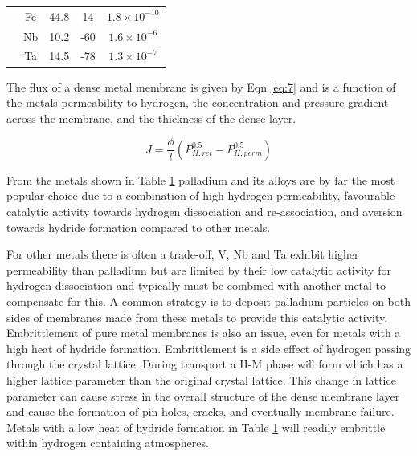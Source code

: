 \begin{table}[htbp]
{\begin{tabular}{@{}ccccc@{}}
                         & Fe                         & 44.8                                                                                             & 14                                                                               & $1.8\times 10^{-10}$                                                                                      \\
                         & Nb                         & 10.2                                                                                             & -60                                                                              & $1.6\times 10^{-6}$                                                                                       \\
                         & Ta                         & 14.5                                                                                             & -78                                                                              & $1.3\times 10^{-7}$                                                                                       \\ \bottomrule
    \end{tabular}}\label{tb:2}
    \end{table}

The flux of a dense metal membrane is given by Eqn \ref{eq:7} and is a function of the metals 
permeability to hydrogen, the concentration and pressure gradient across the membrane, and 
the thickness of the dense layer. 

\begin{equation}\label{eq:7}
    J=\frac{\phi}{l} (P_{H,ret}^{0.5} - P_{H,perm}^{0.5})
\end{equation}

From the metals shown in Table \ref{tb:2} palladium and its alloys are by far the most 
popular choice due to a combination of high hydrogen permeability, favourable catalytic 
activity towards hydrogen dissociation and re-association, and aversion towards hydride 
formation compared to other metals.\cite{NathanW.Ockwig2007, Gryaznov2000, Al-Mufachi2015} 

For other metals there is often a trade-off, V, Nb and Ta exhibit higher permeability than 
palladium but are limited by their low catalytic activity for hydrogen dissociation and 
typically must be combined with another metal to compensate for this. A common strategy is 
to deposit palladium particles on both sides of membranes made from these metals to provide 
this catalytic activity. Embrittlement of pure metal membranes is also an issue, even for 
metals with a high heat of hydride formation. Embrittlement is a side effect of hydrogen 
passing through the crystal lattice. During transport a H-M phase will form which has a 
higher lattice parameter than the original crystal lattice. This change in lattice parameter 
can cause stress in the overall structure of the dense membrane layer and cause the formation 
of pin holes, cracks, and eventually membrane failure. Metals with a low heat of hydride 
formation in Table \ref{tb:2} will readily embrittle within hydrogen containing atmospheres.

